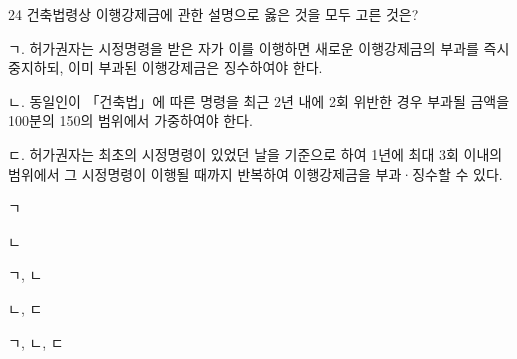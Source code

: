 \begin{question}{24}
건축법령상 이행강제금에 관한 설명으로 옳은 것을 모두 고른 것은?
\begin{framedtext}
ㄱ. 허가권자는 시정명령을 받은 자가 이를 이행하면 새로운 이행강제금의 부과를 즉시 중지하되, 이미 부과된 이행강제금은 징수하여야 한다. \par
ㄴ. 동일인이 「건축법」에 따른 명령을 최근 2년 내에 2회 위반한 경우 부과될 금액을 100분의 150의 범위에서 가중하여야 한다. \par
ㄷ. 허가권자는 최초의 시정명령이 있었던 날을 기준으로 하여 1년에 최대 3회 이내의 범위에서 그 시정명령이 이행될 때까지 반복하여 이행강제금을 부과·징수할 수 있다. \par
\end{framedtext}
\begin{choices}
  \item ㄱ
  \item ㄴ
  \item ㄱ, ㄴ
  \item ㄴ, ㄷ
  \item ㄱ, ㄴ, ㄷ
\end{choices}
\end{question}
